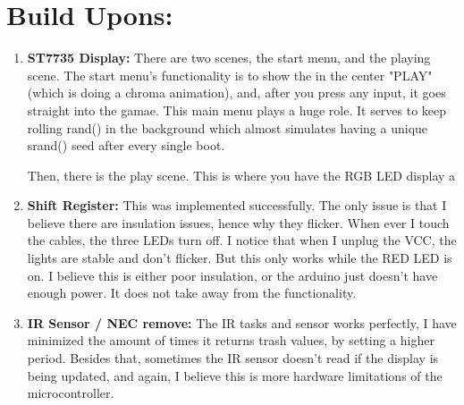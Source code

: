 \documentclass[12pt]{article}
\begin{document}
\section{Build Upons:}
\begin{enumerate}
  \item \textbf{ST7735 Display:}
    There are two scenes, the start menu, and the playing scene.
    The start menu's functionality is to show the in the center "PLAY"
    (which is doing a chroma animation),
    and, after you press any input, it goes straight into the gamae.
    This main menu plays a huge role. It serves to keep rolling rand()
    in the background which almost simulates having 
    a unique srand() seed after every single boot.

    Then, there is the play scene. This is where you have the RGB LED
    display a 
  \item \textbf{Shift Register:} This was implemented successfully.
    The only issue is that I believe there are insulation issues, hence why they flicker.
    When ever I touch the cables, the three LEDs turn off.
    I notice that when I unplug the VCC, the lights are stable and don't flicker.
    But this only works while the RED LED is on.
    I believe this is either poor insulation, or the arduino
    just doesn't have enough power. It does not take away from the functionality.
  \item \textbf{IR Sensor / NEC remove:}
    The IR tasks and sensor works perfectly, 
    I have minimized the amount of times it returns trash values, by setting a higher
    period. Besides that, sometimes the IR sensor doesn't read if the display is being updated,
    and again, I believe this is more hardware limitations of the microcontroller.
\end{enumerate}

\pagebreak
\end{document}
